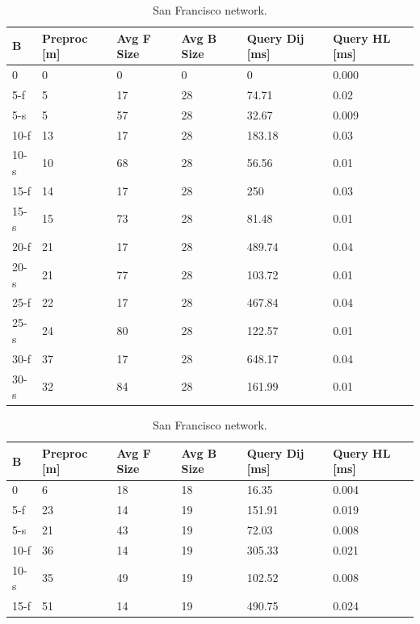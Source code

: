 \begin{table}
\begin{subtable}{.5\textwidth}
\begin{center}
\begin{tabular}{ | l | p{1cm} | p{1cm} | p{1cm} | p{1.2cm} | p{1.2cm} | }
\hline
	B & Preproc [m] & Avg F Size & Avg B Size & Query Dij [ms] & Query HL [ms] \\ \hline \hline
	0 & 0 & 0 & 0 & 0 & 0.000 \\ \hline
5-f  & 5  & 17 & 28 & 74.71  & 0.02  \\
5-s  & 5  & 57 & 28 & 32.67  & 0.009 \\\hline
10-f & 13 & 17 & 28 & 183.18 & 0.03  \\
10-s & 10 & 68 & 28 & 56.56  & 0.01  \\\hline
15-f & 14 & 17 & 28 & 250    & 0.03  \\
15-s & 15 & 73 & 28 & 81.48  & 0.01  \\\hline
20-f & 21 & 17 & 28 & 489.74 & 0.04  \\
20-s & 21 & 77 & 28 & 103.72 & 0.01  \\\hline
25-f & 22 & 17 & 28 & 467.84 & 0.04  \\
25-s & 24 & 80 & 28 & 122.57 & 0.01  \\\hline
30-f & 37 & 17 & 28 & 648.17 & 0.04  \\
30-s & 32 & 84 & 28 & 161.99 & 0.01  \\\hline
\end{tabular}
\caption{San Francisco network.}\label{tab:sf_results}
\end{center}
\end{subtable}
\begin{subtable}{.5\textwidth}
\begin{center}
\begin{tabular}{ | l | p{1cm} | p{1cm} | p{1cm} | p{1.2cm} | p{1.2cm} |}
\hline
	B & Preproc  [m] & Avg F Size & Avg B Size & Query Dij [ms] & Query HL [ms] \\ \hline \hline
	0 & 6 & 18 & 18 & 16.35 & 0.004 \\ \hline
	5-f & 23 & 14& 19 & 151.91 & 0.019 \\ 
	5-s & 21 & 43 &19 & 72.03 & 0.008 \\ \hline
	10-f & 36 & 14 & 19 & 305.33 & 0.021 \\ 
	10-s & 35 & 49 & 19 & 102.52 & 0.008 \\ \hline
	15-f & 51 & 14& 19 & 490.75 & 0.024 \\ 

\end{tabular}
\end{center}
\end{subtable}
\end{table}
